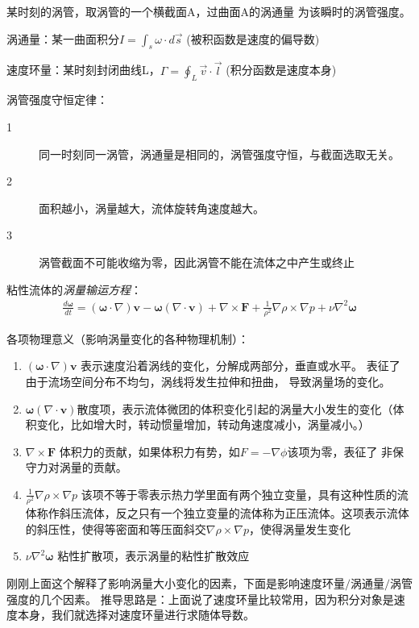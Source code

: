 \documentclass[UTF8,12pt]{article}
\begin{document}
某时刻的涡管，取涡管的一个横截面A，过曲面A的涡通量
为该瞬时的涡管强度。

涡通量：某一曲面积分$I = \int_s \omega \cdot d\vec s$
(被积函数是速度的偏导数)

速度环量：某时刻封闭曲线L，$\varGamma = \oint_L \vec v \cdot \vec l$
(积分函数是速度本身)

涡管强度守恒定律：
\begin{description}
    \item[1] 同一时刻同一涡管，涡通量是相同的，涡管强度守恒，与截面选取无关。
    \item[2] 面积越小，涡量越大，流体旋转角速度越大。
    \item[3] 涡管截面不可能收缩为零，因此涡管不能在流体之中产生或终止
\end{description}

粘性流体的\emph{涡量输运方程}：
\begin{align*}
    \frac{d\boldsymbol \omega}{dt} 
        = (\boldsymbol \omega \cdot \nabla) \boldsymbol v
        - \boldsymbol \omega(\nabla \cdot \boldsymbol v)
        + \nabla \times \boldsymbol F
        + \frac{1}{\rho^2}\nabla\rho \times \nabla p
        + \nu \nabla ^2 \boldsymbol \omega
\end{align*}

各项物理意义（影响涡量变化的各种物理机制）：
\begin{enumerate}
    \item $(\boldsymbol \omega \cdot \nabla) \boldsymbol v$ 表示速度沿着涡线的变化，分解成两部分，垂直或水平。
    表征了
    由于流场空间分布不均匀，涡线将发生拉伸和扭曲，
    导致涡量场的变化。
    \item $\boldsymbol \omega(\nabla \cdot \boldsymbol v)$散度项，表示流体微团的体积变化引起的涡量大小发生的变化（体积变化，比如增大时，转动惯量增加，转动角速度减小，涡量减小。）
    \item $\nabla \times \boldsymbol F$ 体积力的贡献，如果体积力有势，如$F = -\nabla \phi$该项为零，表征了 非保守力对涡量的贡献。
    \item $\frac{1}{\rho^2}\nabla\rho \times \nabla p$ 该项不等于零表示热力学里面有两个独立变量，具有这种性质的流体称作斜压流体，反之只有一个独立变量的流体称为正压流体。这项表示流体的斜压性，使得等密面和等压面斜交$\nabla\rho \times \nabla p$，使得涡量发生变化
    \item $\nu \nabla ^2 \boldsymbol \omega$ 粘性扩散项，表示涡量的粘性扩散效应
\end{enumerate}

刚刚上面这个解释了影响涡量大小变化的因素，下面是影响速度环量$/$涡通量$/$涡管强度的几个因素。
推导思路是：上面说了速度环量比较常用，因为积分对象是速度本身，我们就选择对速度环量进行求随体导数。
\end{document}
